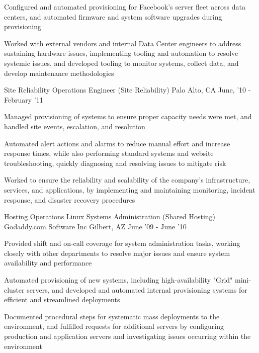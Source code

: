 \begin{cventries}
{\begin{cvitems}
		  \item Configured and automated provisioning for Facebook's server fleet across data centers, and automated firmware and system software upgrades during provisioning
		  \item Worked with external vendors and internal Data Center engineers to address sustaining hardware issues, implementing tooling and automation to resolve systemic issues, and developed tooling to monitor systems, collect data, and develop maintenance methodologies
        \end{cvitems}
    }
\vspace{0mm}
\cventry
	{Site Reliability Operations Engineer \color{solarized-orange}(Site Reliability)} %
    {} %
    {Palo Alto, CA} %
    {June, '10 - February '11} %
    {
        \begin{cvitems}
		  \item Managed provisioning of systems to ensure proper capacity needs were met, and handled site events, escalation, and resolution
	      \item Automated alert actions and alarms to reduce manual effort and increase response times, while also performing standard systems and website troubleshooting, quickly diagnosing and resolving issues to mitigate risk
		  \item Worked to ensure the reliability and scalability of the company's infrastructure, services, and applications, by implementing and maintaining monitoring, incident response, and disaster recovery procedures
        \end{cvitems}
    }
\vspace{2mm}
\cventry
	{Hosting Operations Linux Systems Administration \color{solarized-orange}(Shared Hosting)} %
    {Godaddy.com Software Inc} %
    {Gilbert, AZ} %
    {June '09 - June '10} %
    {
        \begin{cvitems}
		  \item Provided shift and on-call coverage for system administration tasks, working closely with other departments to resolve major issues and ensure system availability and performance
		  \item Automated provisioning of new systems, including high-availability "Grid" mini-cluster servers, and developed and automated internal provisioning systems for efficient and streamlined deployments
		  \item Documented procedural steps for systematic mass deployments to the environment, and fulfilled requests for additional servers by configuring production and application servers and investigating issues occurring within the environment

\end{cvitems}}
\end{cventries}
